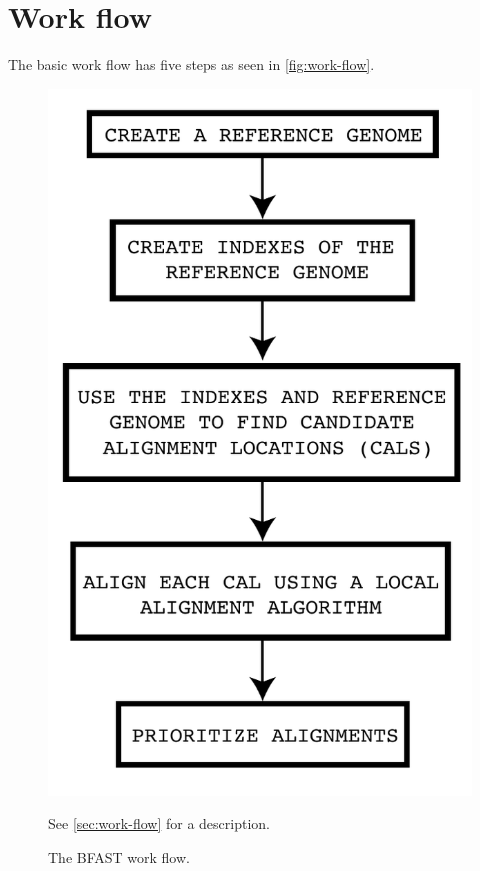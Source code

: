 \documentclass[a4paper,12pt]{book}
\begin{document}
\section{Work flow}
\label{sec:work-flow}
The basic work flow has five steps as seen in \autoref{fig:work-flow}.
\begin{figure}[t]
	\centering
	\includegraphics[scale=0.75]{work-flow.pdf}
	\caption{
	The BFAST work flow.
	}{
	See \autoref{sec:work-flow} for a description.
	\label{fig:work-flow}
	}
\end{figure}
\end{document}
